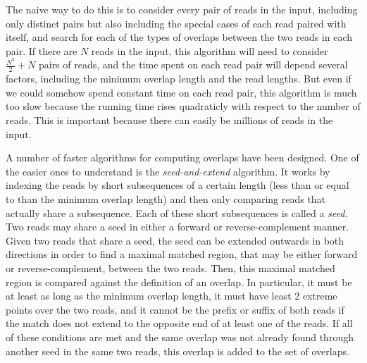 \documentclass[10pt]{article}
\newcommand{\KeyTerm}[1]{{\it #1}}
\begin{document}
The naive way to do this is to consider every pair of reads in the input,
including only distinct pairs but also including the special cases of each read
paired with itself, and search for each of the types of overlaps between the two
reads in each pair.  If there are $N$ reads in the input, this algorithm will
need to consider $\frac{N^2}{2} + N$ pairs of reads, and the time spent on each
read pair will depend several factors, including the minimum overlap length and
the read lengths.  But even if we could somehow spend constant time on each read
pair, this algorithm is much too slow because the running time rises quadraticly
with respect to the number of reads.  This is important because there can easily
be millions of reads in the input.

A number of faster algorithms for computing overlaps have been designed.  One of
the easier ones to understand is the \KeyTerm{seed-and-extend} algorithm.  It
works by indexing the reads by short subsequences of a certain length (less than
or equal to than the minimum overlap length) and then only comparing reads that
actually share a subsequence.  Each of these short subsequences is called a
\KeyTerm{seed}.  Two reads may share a seed in either a forward or
reverse-complement manner.  Given two reads that share a seed, the seed can be
extended outwards in both directions in order to find a maximal matched region,
that may be either forward or reverse-complement, between the two reads.  Then,
this maximal matched region is compared against the definition of an overlap.
In particular, it must be at least as long as the minimum overlap length, it
must have least 2 extreme points over the two reads, and it cannot be the prefix
or suffix of both reads if the match does not extend to the opposite end of at
least one of the reads.  If all of these conditions are met and the same overlap
was not already found through another seed in the same two reads, this overlap
is added to the set of overlaps.
\end{document}
